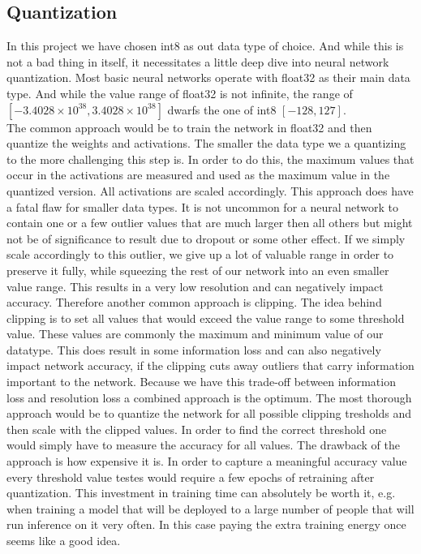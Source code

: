 \documentclass[]{IEEEtran}
\begin{document}
\subsection{Quantization}
In this project we have chosen int8 as out data type of choice. And while this is not a bad thing in itself, it necessitates a little deep dive into neural network quantization. Most basic neural networks operate with float32 as their main data type. And while the value range of float32 is not infinite, the range of $[-3.4028 \times 10^{38}, 3.4028 \times 10^{38}]$ dwarfs the one of int8 $[-128, 127]$. \\
The common approach would be to train the network in float32 and then quantize the weights and activations. The smaller the data type we a quantizing to the more challenging this step is. In order to do this, the maximum values that occur in the activations are measured and used as the maximum value in the quantized version. All activations are scaled accordingly. This approach does have a fatal flaw for smaller data types. It is not uncommon for a neural network to contain one or a few outlier values that are much larger then all others but might not be of significance to result due to dropout or some other effect. If we simply scale accordingly to this outlier, we give up a lot of valuable range in order to preserve it fully, while squeezing the rest of our network into an even smaller value range. This results in a very low resolution and can negatively impact accuracy. Therefore another common approach is clipping. The idea behind clipping is to set all values that would exceed the value range to some threshold value. These values are commonly the maximum and minimum value of our datatype. This does result in some information loss and can also negatively impact network accuracy, if the clipping cuts away outliers that carry information important to the network. Because we have this trade-off between information loss and resolution loss a combined approach is the optimum. The most thorough approach would be to quantize the network for all possible clipping tresholds and then scale with the clipped values. In order to find the correct threshold one would simply have to measure the accuracy for all values. The drawback of the approach is how expensive it is. In order to capture a meaningful accuracy value every threshold value testes would require a few epochs of retraining after quantization. This investment in training time can absolutely be worth it, e.g. when training a model that will be deployed to a large number of people that will run inference on it very often. In this case paying the extra training energy once seems like a good idea. \\
\end{document}
